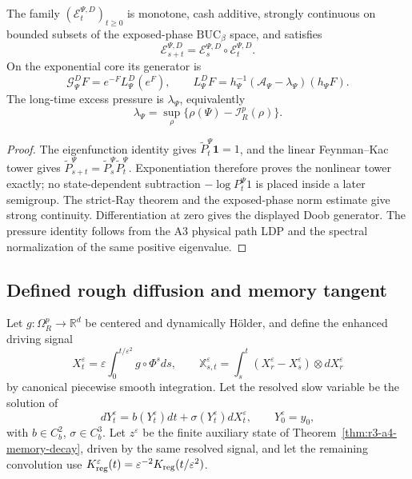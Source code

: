 \begin{theorem}
\label{thm:r3-a4-nonlinear}
The family \((\mathcal E_t^{\Psi,D})_{t\ge0}\) is monotone, cash additive,
strongly continuous on bounded subsets of the exposed-phase
\(\mathrm{BUC}_\beta\) space, and satisfies
\[
 \mathcal E_{s+t}^{\Psi,D}
 =\mathcal E_s^{\Psi,D}\circ\mathcal E_t^{\Psi,D}.
\]
On the exponential core its generator is
\[
 \mathcal G_\Psi^DF
 =e^{-F}L_\Psi^D(e^F),
 \qquad
 L_\Psi^DF=h_\Psi^{-1}(\mathcal A_\Psi-\lambda_\Psi)
 (h_\Psi F).
\]
The long-time excess pressure is \(\lambda_\Psi\), equivalently
\[
 \lambda_\Psi
 =\sup_\rho\{\rho(\Psi)-\mathcal I_R^p(\rho)\}.
\]
\end{theorem}

\begin{proof}
The eigenfunction identity gives
\(\widetilde P_t^\Psi\mathbf1=1\), and the linear Feynman--Kac tower gives
\(\widetilde P_{s+t}^\Psi=\widetilde P_s^\Psi\widetilde P_t^\Psi\).
Exponentiation therefore proves the nonlinear tower exactly; no state-dependent
subtraction \(-\log P_t^\Psi1\) is placed inside a later semigroup.  The
strict-Ray theorem and the exposed-phase norm estimate give strong
continuity.  Differentiation at zero gives the displayed Doob generator.  The
pressure identity follows from the A3 physical path LDP and the spectral
normalization of the same positive eigenvalue.
\end{proof}

\subsection{Defined rough diffusion and memory tangent}

Let \(g:\Omega_R^p\to\mathbb R^d\) be centered and dynamically H\"older, and
define the enhanced driving signal
\[
 X_t^\varepsilon
 =\varepsilon\int_0^{t/\varepsilon^2}g\circ\Phi^sds,
 \qquad
 \mathbb X_{s,t}^\varepsilon
 =\int_s^t(X_r^\varepsilon-X_s^\varepsilon)
 \otimes dX_r^\varepsilon
\]
by canonical piecewise smooth integration.  Let the resolved slow variable be
the solution of
\[
 dY_t^\varepsilon=b(Y_t^\varepsilon)dt+
 \sigma(Y_t^\varepsilon)dX_t^\varepsilon,
 \qquad Y_0^\varepsilon=y_0,
\]
with \(b\in C_b^2\), \(\sigma\in C_b^3\).  Let \(z^\varepsilon\) be the
finite auxiliary state of Theorem~\ref{thm:r3-a4-memory-decay}, driven by the
same resolved signal, and let the remaining convolution use
\(K_{\rm reg}^\varepsilon(t)=\varepsilon^{-2}K_{\rm reg}(t/\varepsilon^2)\).

